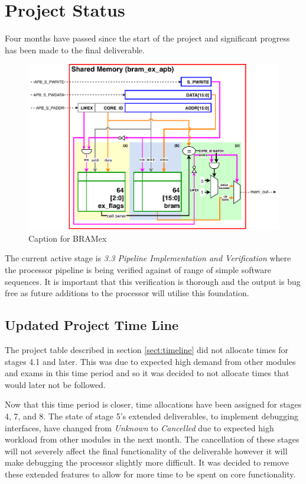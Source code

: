 \section{Project Status}
Four months have passed since the start of the project and significant progress has been made to the final deliverable. 


\begin{figure}[H]
\centering 
\includegraphics[width=15cm]{../img/bram_ex}
\caption{Caption for BRAMex}
\label{fig:ex}
\end{figure}

The current active stage is \textit{3.3 Pipeline Implementation and Verification} where the processor pipeline is being verified against of range of simple software sequences. It is important that this verification is thorough and the output is bug free as future additions to the processor will utilise this foundation.

\subsection{Updated Project Time Line}
The project table described in section \ref{sect:timeline} did not allocate times for stages 4.1 and later. This was due to expected high demand from other modules and exams in this time period and so it was decided to not allocate times that would later not be followed.

Now that this time period is closer, time allocations have been assigned for stages 4, 7, and 8. The state of stage 5's extended deliverables, to implement debugging interfaces, have changed from \textit{Unknown} to \textit{Cancelled} due to expected high workload from other modules in the next month. The cancellation of these stages will not severely affect the final functionality of the deliverable however it will make debugging the processor slightly more difficult. It was decided to remove these extended features to allow for more time to be spent on core functionality.

